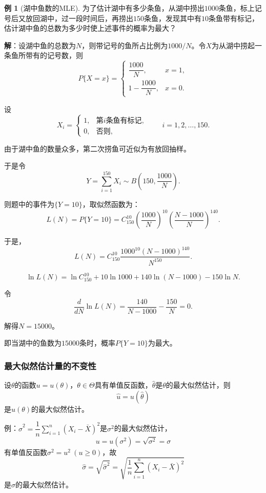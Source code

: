 \documentclass[11pt,a4paper]{report}
\theoremstyle{definition}
\newtheorem{example}{例}[chapter]
\begin{document}
\begin{example}[湖中鱼数的MLE]
为了估计湖中有多少条鱼，从湖中捞出$1000$条鱼，标上记号后又放回湖中，过一段时间后，再捞出$150$条鱼，发现其中有$10$条鱼带有标记，估计湖中鱼的总数为多少时使上述事件的概率为最大？

\textbf{解}：设湖中鱼的总数为$N$，则带记号的鱼所占比例为$1000/N$。令$X$为从湖中捞起一条鱼所带有的记号数，则
\[
P\{X=x\}=
\begin{cases}
\dfrac{1000}{N}, & x=1,\\[0.5em]
1-\dfrac{1000}{N}, & x=0.
\end{cases}
\]

设
\[
X_{i}=
\begin{cases}
1, & \text{第}i\text{条鱼有标记},\\
0, & \text{否则},
\end{cases}
\qquad i=1,2,\ldots,150.
\]

由于湖中鱼的数量众多，第二次捞鱼可近似为有放回抽样。

于是令
\[
Y=\sum_{i=1}^{150}X_{i}\sim B\left(150,\frac{1000}{N}\right).
\]

则题中的事件为$\{Y=10\}$，取似然函数为：
\[
L(N)=P\{Y=10\}=C_{150}^{10}\left(\frac{1000}{N}\right)^{10}\left(\frac{N-1000}{N}\right)^{140}.
\]

于是，
\[
L(N)=C_{150}^{10}\frac{1000^{10}(N-1000)^{140}}{N^{150}}.
\]

\[
\ln L(N)=\ln C_{150}^{10}+10\ln 1000+140\ln(N-1000)-150\ln N.
\]

令
\[
\frac{d}{dN}\ln L(N)=\frac{140}{N-1000}-\frac{150}{N}=0.
\]

解得$N=15000$。

即当湖中的鱼数为$15000$条时，概率$P\{Y=10\}$为最大。
\end{example}

\subsubsection*{最大似然估计量的不变性}

设$\theta$的函数$u=u(\theta)$，$\theta\in\Theta$具有单值反函数，$\hat{\theta}$是$\theta$的最大似然估计，则
\[
\hat{u}=u(\hat{\theta})
\]
是$u(\theta)$的最大似然估计。

例：$\hat{\sigma}^{2}=\dfrac{1}{n}\displaystyle\sum_{i=1}^{n}(X_{i}-\bar{X})^{2}$是$\sigma^{2}$的最大似然估计，
\[
u=u(\sigma^{2})=\sqrt{\sigma^{2}}=\sigma
\]
有单值反函数$\sigma^{2}=u^{2}\ (u\geq 0)$，故
\[
\hat{\sigma}=\sqrt{\hat{\sigma}^{2}}=\sqrt{\frac{1}{n}\sum_{i=1}^{n}(X_{i}-\bar{X})^{2}}
\]
是$\sigma$的最大似然估计。
\end{document}

